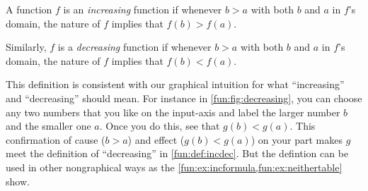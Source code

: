 \begin{pccdefinition}\label{fun:def:incdec}

A function $f$ is an \emph{increasing} function if whenever $b>a$ with both $b$ and $a$ in $f$'s domain, the nature of $f$ implies that $f(b)>f(a)$.

Similarly, $f$ is a \emph{decreasing} function if whenever $b>a$ with both $b$ and $a$ in $f$'s domain, the nature of $f$ implies that $f(b)<f(a)$.

\end{pccdefinition}

This definition is consistent with our graphical intuition for what ``increasing'' and ``decreasing'' should mean. For instance in \cref{fun:fig:decreasing}, you can choose any two numbers that you like on the input-axis and label the larger number $b$ and the smaller one $a$. Once you do this, see that $g(b)<g(a)$. This confirmation of cause ($b>a$) and effect ($g(b)<g(a)$) on your part makes $g$ meet the definition of ``decreasing'' in \cref{fun:def:incdec}. But the defintion can be used in other nongraphical ways as the \cref{fun:ex:incformula,fun:ex:neithertable} show.


